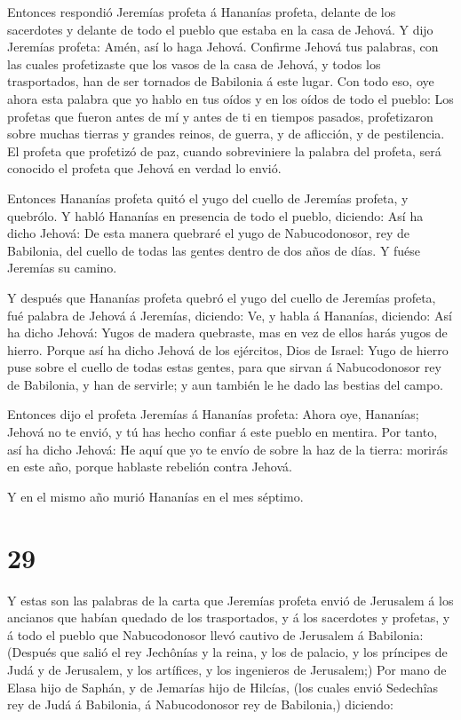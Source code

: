  Entonces respondió Jeremías profeta á Hananías profeta,
delante de los sacerdotes y delante de todo el pueblo que estaba en la
casa de Jehová.  Y dijo Jeremías profeta: Amén, así lo haga
Jehová. Confirme Jehová tus palabras, con las cuales profetizaste que
los vasos de la casa de Jehová, y todos los trasportados, han de ser
tornados de Babilonia á este lugar.  Con todo eso, oye ahora
esta palabra que yo hablo en tus oídos y en los oídos de todo el pueblo:
 Los profetas que fueron antes de mí y antes de ti en
tiempos pasados, profetizaron sobre muchas tierras y grandes reinos, de
guerra, y de aflicción, y de pestilencia.  El profeta que
profetizó de paz, cuando sobreviniere la palabra del profeta, será
conocido el profeta que Jehová en verdad lo envió.

 Entonces Hananías profeta quitó el yugo del cuello de
Jeremías profeta, y quebrólo.  Y habló Hananías en
presencia de todo el pueblo, diciendo: Así ha dicho Jehová: De esta
manera quebraré el yugo de Nabucodonosor, rey de Babilonia, del cuello
de todas las gentes dentro de dos años de días. Y fuése Jeremías su
camino.

 Y después que Hananías profeta quebró el yugo del cuello
de Jeremías profeta, fué palabra de Jehová á Jeremías, diciendo:
 Ve, y habla á Hananías, diciendo: Así ha dicho Jehová:
Yugos de madera quebraste, mas en vez de ellos harás yugos de hierro.
 Porque así ha dicho Jehová de los ejércitos, Dios de
Israel: Yugo de hierro puse sobre el cuello de todas estas gentes, para
que sirvan á Nabucodonosor rey de Babilonia, y han de servirle; y aun
también le he dado las bestias del campo.

 Entonces dijo el profeta Jeremías á Hananías profeta:
Ahora oye, Hananías; Jehová no te envió, y tú has hecho confiar á este
pueblo en mentira.  Por tanto, así ha dicho Jehová: He aquí
que yo te envío de sobre la haz de la tierra: morirás en este año,
porque hablaste rebelión contra Jehová.

 Y en el mismo año murió Hananías en el mes séptimo.

\hypertarget{section-28}{%
\section{29}\label{section-28}}

 Y estas son las palabras de la carta que Jeremías profeta
envió de Jerusalem á los ancianos que habían quedado de los
trasportados, y á los sacerdotes y profetas, y á todo el pueblo que
Nabucodonosor llevó cautivo de Jerusalem á Babilonia: 
(Después que salió el rey Jechônías y la reina, y los de palacio, y los
príncipes de Judá y de Jerusalem, y los artífices, y los ingenieros de
Jerusalem;)  Por mano de Elasa hijo de Saphán, y de Jemarías
hijo de Hilcías, (los cuales envió Sedechîas rey de Judá á Babilonia, á
Nabucodonosor rey de Babilonia,) diciendo:

